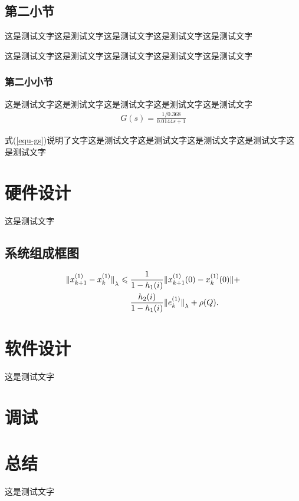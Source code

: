 \documentclass[UTF8,zihao=5,twoside]{ctexart}
\newcommand{\equstyle}{\setlength\abovedisplayskip{6pt}\setlength\belowdisplayskip{-6pt}}
\begin{document}
\begin{multicols}{2}
        \subsection{第二小节}
        这是测试文字这是测试文字这是测试文字这是测试文字这是测试文字


        这是测试文字这是测试文字这是测试文字这是测试文字这是测试文字



            \subsubsection{第二小小节}
            这是测试文字这是测试文字这是测试文字这是测试文字这是测试文字
                {\equstyle
                \begin{align}
                    G(s)=\frac{1/0.368}{0.0144s+1}
                    \label{equ-gs}
                \end{align}}

            式(\ref{equ-gs})说明了文字这是测试文字这是测试文字这是测试文字这是测试文字这是测试文字

    \section{硬件设计}
    这是测试文字
        \subsection{系统组成框图}
            \begin{align}
            {\Arrowvert x^{(1)}_{k+1}-x^{(1)}_k\Arrowvert}_\lambda\leqslant \;&
            \frac{1}{1-h_1(i)}\Arrowvert x^{(1)}_{k+1}(0)-x^{(1)}_k(0)\Arrowvert+\notag\\
            &\frac{h_2(i)}{1-h_1(i)}{\Arrowvert
            	e^{(1)}_k\Arrowvert}_\lambda+\rho(Q).
            \end{align}
    \section{软件设计}
这是测试文字

    \section{调试}

    \section{总结}
这是测试文字


\end{multicols}
\end{document}
